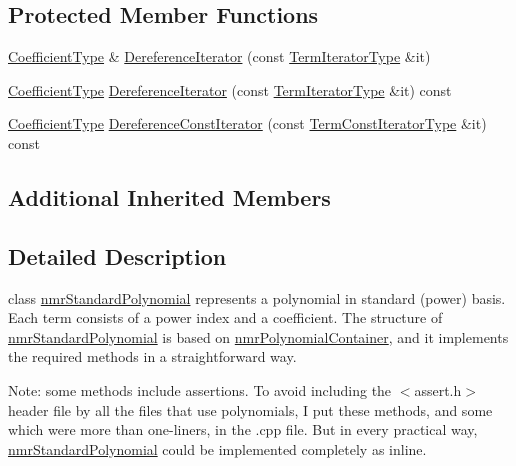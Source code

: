 \subsection*{Protected Member Functions}
\begin{DoxyCompactItemize}
\item 
\hyperlink{classnmr_polynomial_base_a8693efdfc8585ccb49abea69f74f3eef}{Coefficient\-Type} \& \hyperlink{classnmr_standard_polynomial_a03b09b1e9f63910970b20c3f23c849be}{Dereference\-Iterator} (const \hyperlink{classnmr_polynomial_container_a276e57445d038e8a16462f47b85719a3}{Term\-Iterator\-Type} \&it)
\item 
\hyperlink{classnmr_polynomial_base_a8693efdfc8585ccb49abea69f74f3eef}{Coefficient\-Type} \hyperlink{classnmr_standard_polynomial_a27fed8c56e3dbdd3e9e94354a3146ca3}{Dereference\-Iterator} (const \hyperlink{classnmr_polynomial_container_a276e57445d038e8a16462f47b85719a3}{Term\-Iterator\-Type} \&it) const 
\item 
\hyperlink{classnmr_polynomial_base_a8693efdfc8585ccb49abea69f74f3eef}{Coefficient\-Type} \hyperlink{classnmr_standard_polynomial_afd34019b92b74fc18c5d8271a08c605c}{Dereference\-Const\-Iterator} (const \hyperlink{classnmr_polynomial_container_aba8d31506ab6a487fdc4fe2815469442}{Term\-Const\-Iterator\-Type} \&it) const 
\end{DoxyCompactItemize}
\subsection*{Additional Inherited Members}


\subsection{Detailed Description}
class \hyperlink{classnmr_standard_polynomial}{nmr\-Standard\-Polynomial} represents a polynomial in standard (power) basis. Each term consists of a power index and a coefficient. The structure of \hyperlink{classnmr_standard_polynomial}{nmr\-Standard\-Polynomial} is based on \hyperlink{classnmr_polynomial_container}{nmr\-Polynomial\-Container}, and it implements the required methods in a straightforward way.

Note\-: some methods include assertions. To avoid including the $<$assert.\-h$>$ header file by all the files that use polynomials, I put these methods, and some which were more than one-\/liners, in the .cpp file. But in every practical way, \hyperlink{classnmr_standard_polynomial}{nmr\-Standard\-Polynomial} could be implemented completely as inline.

